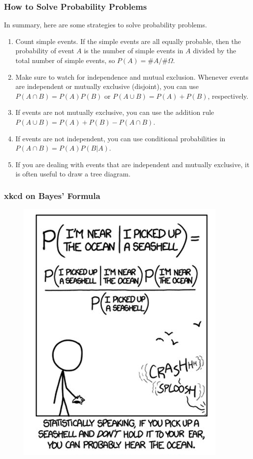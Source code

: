 \documentclass[xcolor=dvipsnames]{beamer}
\begin{document}
\begin{frame}
  \frametitle{How to Solve Probability Problems}
In summary, here are some strategies to solve probability problems.
\begin{enumerate}
\item Count simple events. If the simple events are all equally
  probable, then the probability of event $A$ is the number of simple
  events in $A$ divided by the total number of simple events, so
  $P(A)=\#A/\#\Omega$.
\item Make sure to watch for independence and mutual exclusion.
  Whenever events are independent or mutually exclusive (disjoint),
  you can use $P(A\cap{}B)=P(A)P(B)$ or $P(A\cup{}B)=P(A)+P(B)$,
  respectively.
\item If events are not mutually exclusive, you can use the
  addition rule $P(A\cup{}B)=P(A)+P(B)-P(A\cap{}B)$.
\item If events are not independent, you can use conditional
  probabilities in $P(A\cap{}B)=P(A)P(B|A)$.
\item If you are dealing with events that are independent and
  mutually exclusive, it is often useful to draw a tree diagram.
\end{enumerate}
\end{frame}

\begin{frame}
  \frametitle{xkcd on Bayes' Formula}
\begin{figure}[h]
\includegraphics[scale=.5]{./diagrams/xkcd_bayes1.png}
\end{figure}
\end{frame}
\end{document}
